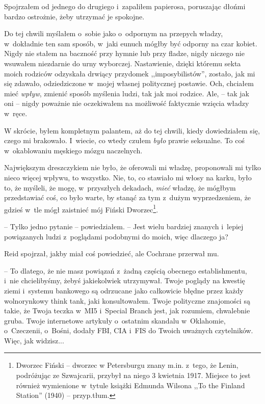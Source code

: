\documentclass[oneside,polish,11pt,sfheadings]{mwbk}
\begin{document}
Spojrzałem od jednego do drugiego i~zapaliłem papierosa, poruszając
dłońmi bardzo ostrożnie, żeby utrzymać je spokojne.

Do tej chwili myślałem o~sobie jako o~odpornym na przepych władzy, w~dokładnie ten sam sposób, w~jaki eunuch mógłby być odporny na czar
kobiet. Nigdy nie stałem na baczność przy hymnie lub przy fladze, nigdy
niczego nie wsuwałem niezdarnie do urny wyborczej. Nastawienie, dzięki
któremu sekta moich rodziców odzyskała drwiący przydomek
,,imposybilistów'', zostało, jak mi się zdawało, odziedziczone w~mojej
własnej politycznej postawie. Och, chciałem mieć \emph{wpływ}, zmienić
sposób myślenia ludzi, tak jak moi rodzice. Ale, -- tak jak oni -- nigdy
poważnie nie oczekiwałem na możliwość faktycznie wzięcia władzy w~ręce.

W skrócie, byłem kompletnym palantem, aż do tej chwili, kiedy
dowiedziałem się, czego mi brakowało. I~wiecie, co wtedy czułem
\emph{było} prawie seksualne. To coś w~okablowaniu męskiego mózgu
naczelnych.

Największym dreszczykiem nie było, że oferowali mi władzę, proponowali
mi tylko nieco więcej wpływu, to wszystko. Nie, to, co stawiało mi włosy
na karku, było to, że myśleli, że mogę, w~przyszłych dekadach,
\emph{mieć} władzę, że mógłbym przedstawiać coś, co było warte, by
stanąć za tym z~dużym wyprzedzeniem, że gdzieś w~tle mógł zaistnieć mój
Fiński Dworzec\footnote{Dworzec Fiński -- dworzec w Petersburgu znany m.in. z~tego, że Lenin, podróżując ze Szwajcarii, przybył na niego 3 kwietnia 1917. Miejsce to
jest również wymienione w~tytule książki Edmunda Wilsona ,,To the
Finland Station'' (1940) -- przyp.tłum.}.

-- Tylko jedno pytanie -- powiedziałem. -- Jest wielu bardziej znanych i~lepiej powiązanych ludzi z~poglądami podobnymi do moich, więc dlaczego
ja?

Reid spojrzał, jakby miał coś powiedzieć, ale Cochrane przerwał mu.

-- To dlatego, że nie masz powiązań z~żadną częścią obecnego
establishmentu, i~nie chcielibyśmy, żebyś jakiekolwiek utrzymywał. Twoje
poglądy na kwestię ziemi i~systemu bankowego są odrzucane jako
całkowicie błędne przez każdy wolnorynkowy think tank, jaki
konsultowałem. Twoje polityczne znajomości są takie, że Twoja teczka w~MI5 i~Special Branch jest, jak rozumiem, chwalebnie gruba. Twoje
internetowe artykuły o~ostatnim skandalu w~Oklahomie, o~Czeczenii, o~Bośni, dodały FBI, CIA i~FIS do Twoich uważnych czytelników. Więc, jak
widzisz...
\end{document}
